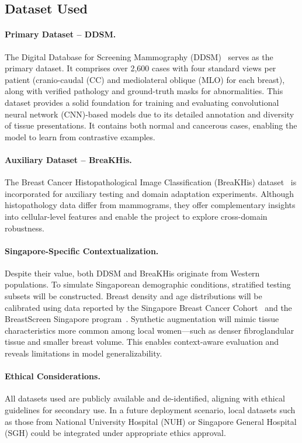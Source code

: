 \documentclass[12pt]{article}
\begin{document}
\subsection{Dataset Used}

\paragraph{Primary Dataset – DDSM.}
The Digital Database for Screening Mammography (DDSM)~\cite{17} serves as the primary dataset. It comprises over 2,600 cases with four standard views per patient (cranio-caudal (CC) and mediolateral oblique (MLO) for each breast), along with verified pathology and ground-truth masks for abnormalities. This dataset provides a solid foundation for training and evaluating convolutional neural network (CNN)-based models due to its detailed annotation and diversity of tissue presentations. It contains both normal and cancerous cases, enabling the model to learn from contrastive examples.

\paragraph{Auxiliary Dataset – BreaKHis.}
The Breast Cancer Histopathological Image Classification (BreaKHis) dataset~\cite{18} is incorporated for auxiliary testing and domain adaptation experiments. Although histopathology data differ from mammograms, they offer complementary insights into cellular-level features and enable the project to explore cross-domain robustness.

\paragraph{Singapore-Specific Contextualization.}
Despite their value, both DDSM and BreaKHis originate from Western populations. To simulate Singaporean demographic conditions, stratified testing subsets will be constructed. Breast density and age distributions will be calibrated using data reported by the Singapore Breast Cancer Cohort~\cite{6} and the BreastScreen Singapore program~\cite{19}. Synthetic augmentation will mimic tissue characteristics more common among local women—such as denser fibroglandular tissue and smaller breast volume. This enables context-aware evaluation and reveals limitations in model generalizability.

\paragraph{Ethical Considerations.}
All datasets used are publicly available and de-identified, aligning with ethical guidelines for secondary use. In a future deployment scenario, local datasets such as those from National University Hospital (NUH) or Singapore General Hospital (SGH) could be integrated under appropriate ethics approval.
\end{document}
